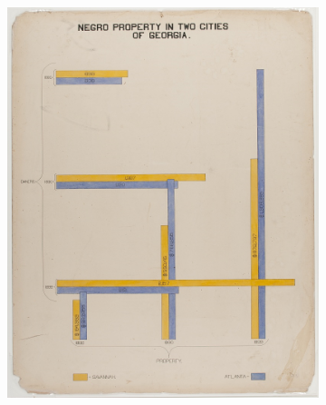 \documentclass[../main.tex]{subfiles}
\begin{document}
\begin{figure}[H]
\begin{subfigure}{.24\textwidth}
        \includegraphics[width=1\textwidth]{figures/intro/du_bois_bar.png}
        \caption{}
        \label{fig:intro_dpb}
    \end{subfigure}
    \begin{subfigure}{.24\textwidth}

\end{subfigure}
\end{figure}
\end{document}
